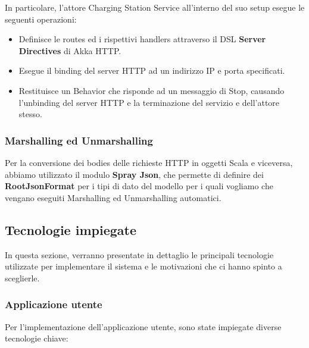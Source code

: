 In particolare, l'attore Charging Station Service all'interno del suo setup esegue le seguenti operazioni:
\begin{itemize}
      \item Definisce le routes ed i rispettivi handlers attraverso il DSL \textbf{Server Directives} di Akka HTTP.
      \item Esegue il binding del server HTTP ad un indirizzo IP e porta specificati.
      \item Restituisce un Behavior che risponde ad un messaggio di Stop, causando l'unbinding del server HTTP e la terminazione del servizio e dell'attore stesso.
\end{itemize}

\subsubsection{Marshalling ed Unmarshalling}
Per la conversione dei bodies delle richieste HTTP in oggetti Scala e viceversa, abbiamo utilizzato
il modulo \textbf{Spray Json}, che permette di definire dei \textbf{RootJsonFormat} per i tipi di dato
del modello per i quali vogliamo che vengano eseguiti Marshalling ed Unmarshalling automatici.\\

\subsection{Tecnologie impiegate}

In questa sezione, verranno presentate in dettaglio le principali tecnologie utilizzate per implementare
il sistema e le motivazioni che ci hanno spinto a sceglierle.

\subsubsection{Applicazione utente}

Per l'implementazione dell'applicazione utente, sono state impiegate diverse tecnologie chiave:

